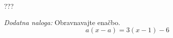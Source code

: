 \documentclass[addpoints]{exam}
\begin{document}
\begin{questions}
         
         \begin{solution}[3cm]
             ???
         \end{solution}
     
          \newpage
     
     
     
         
     
     
     
     
     
     
          \newpage
     
     
     
         \bonusquestion[3]
         \textit{Dodatna naloga:} Obravnavajte enačbo. $$a(x-a)=3(x-1)-6$$
     

\end{questions}
\end{document}
